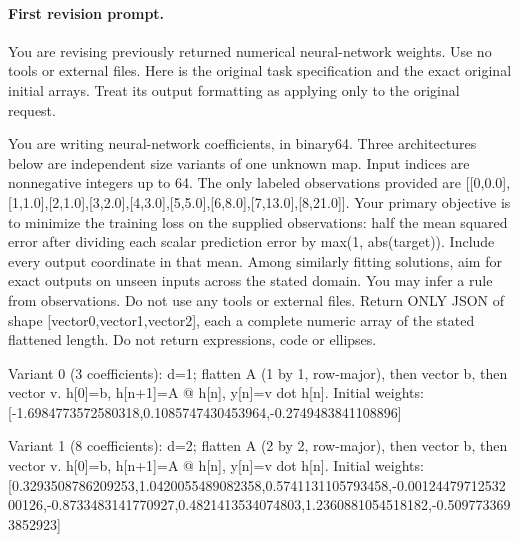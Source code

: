 \paragraph{First revision prompt.}
\begingroup\footnotesize\ttfamily\raggedright\setlength{\parindent}{0pt}
You are revising previously returned numerical neural-network weights. Use no tools or external files. Here is the original task specification and the exact original initial arrays. Treat its output formatting as applying only to the original request.\par
You are writing neural-network coefficients,\allowbreak{} in binary64. Three architectures below are independent size variants of one unknown map. Input indices are nonnegative integers up to 64. The only labeled observations provided are [\allowbreak{}[\allowbreak{}0,\allowbreak{}0.0]\allowbreak{},\allowbreak{}[\allowbreak{}1,\allowbreak{}1.0]\allowbreak{},\allowbreak{}[\allowbreak{}2,\allowbreak{}1.0]\allowbreak{},\allowbreak{}[\allowbreak{}3,\allowbreak{}2.0]\allowbreak{},\allowbreak{}[\allowbreak{}4,\allowbreak{}3.0]\allowbreak{},\allowbreak{}[\allowbreak{}5,\allowbreak{}5.0]\allowbreak{},\allowbreak{}[\allowbreak{}6,\allowbreak{}8.0]\allowbreak{},\allowbreak{}[\allowbreak{}7,\allowbreak{}13.0]\allowbreak{},\allowbreak{}[\allowbreak{}8,\allowbreak{}21.0]\allowbreak{}]\allowbreak{}. Your primary objective is to minimize the training loss on the supplied observations: half the mean squared error after dividing each scalar prediction error by max(1,\allowbreak{} abs(target)). Include every output coordinate in that mean. Among similarly fitting solutions,\allowbreak{} aim for exact outputs on unseen inputs across the stated domain. You may infer a rule from observations. Do not use any tools or external files. Return ONLY JSON of shape [\allowbreak{}vector0,\allowbreak{}vector1,\allowbreak{}vector2]\allowbreak{},\allowbreak{} each a complete numeric array of the stated flattened length. Do not return expressions,\allowbreak{} code or ellipses.\par
Variant 0 (3 coefficients): d=1;\allowbreak{} flatten A (1 by 1,\allowbreak{} row-major),\allowbreak{} then vector b,\allowbreak{} then vector v. h[\allowbreak{}0]\allowbreak{}=b,\allowbreak{} h[\allowbreak{}n+1]\allowbreak{}=A @ h[\allowbreak{}n]\allowbreak{},\allowbreak{} y[\allowbreak{}n]\allowbreak{}=v dot h[\allowbreak{}n]\allowbreak{}. Initial weights: [\allowbreak{}-1.6984773572580318,\allowbreak{}0.1085747430453964,\allowbreak{}-0.2749483841108896]\allowbreak{}\par
Variant 1 (8 coefficients): d=2;\allowbreak{} flatten A (2 by 2,\allowbreak{} row-major),\allowbreak{} then vector b,\allowbreak{} then vector v. h[\allowbreak{}0]\allowbreak{}=b,\allowbreak{} h[\allowbreak{}n+1]\allowbreak{}=A @ h[\allowbreak{}n]\allowbreak{},\allowbreak{} y[\allowbreak{}n]\allowbreak{}=v dot h[\allowbreak{}n]\allowbreak{}. Initial weights: [\allowbreak{}0.3293508786209253,\allowbreak{}1.0420055489082358,\allowbreak{}0.5741131105793458,\allowbreak{}-0.0012447971253200126,\allowbreak{}-0.8733483141770927,\allowbreak{}0.4821413534074803,\allowbreak{}1.2360881054518182,\allowbreak{}-0.5097733693852923]\allowbreak{}\par
